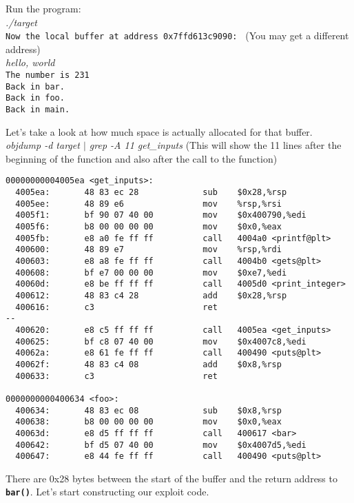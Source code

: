 \documentclass{article}
\newcommand{\function}[1]{\textbf{\lstinline{#1}}}
\begin{document}
Run the program: \\
\textit{./target} \\
\texttt{Now the local buffer at address 0x7ffd613c9090: } {\footnotesize (You  may get a different address)} \\
\textit{hello, world} \\
\texttt{The number is 231 \\
Back in bar. \\
Back in foo. \\
Back in main.}

Let's take a look at how much space is actually allocated for that buffer. \\
\textit{objdump -d target $|$ grep -A 11 get\_inputs} {\footnotesize (This will show the 11 lines after the beginning of the function and also after the call to the function)} \\
\begin{lstlisting}[language={[x86masm]Assembler}]
00000000004005ea <get_inputs>:
  4005ea:       48 83 ec 28             sub    $0x28,%rsp
  4005ee:       48 89 e6                mov    %rsp,%rsi
  4005f1:       bf 90 07 40 00          mov    $0x400790,%edi
  4005f6:       b8 00 00 00 00          mov    $0x0,%eax
  4005fb:       e8 a0 fe ff ff          call   4004a0 <printf@plt>
  400600:       48 89 e7                mov    %rsp,%rdi
  400603:       e8 a8 fe ff ff          call   4004b0 <gets@plt>
  400608:       bf e7 00 00 00          mov    $0xe7,%edi
  40060d:       e8 be ff ff ff          call   4005d0 <print_integer>
  400612:       48 83 c4 28             add    $0x28,%rsp
  400616:       c3                      ret
--
  400620:       e8 c5 ff ff ff          call   4005ea <get_inputs>
  400625:       bf c8 07 40 00          mov    $0x4007c8,%edi
  40062a:       e8 61 fe ff ff          call   400490 <puts@plt>
  40062f:       48 83 c4 08             add    $0x8,%rsp
  400633:       c3                      ret

0000000000400634 <foo>:
  400634:       48 83 ec 08             sub    $0x8,%rsp
  400638:       b8 00 00 00 00          mov    $0x0,%eax
  40063d:       e8 d5 ff ff ff          call   400617 <bar>
  400642:       bf d5 07 40 00          mov    $0x4007d5,%edi
  400647:       e8 44 fe ff ff          call   400490 <puts@plt>
\end{lstlisting}

There are 0x28 bytes between the start of the buffer and the return address to \function{bar()}. Let's start constructing our exploit code.
\end{document}
